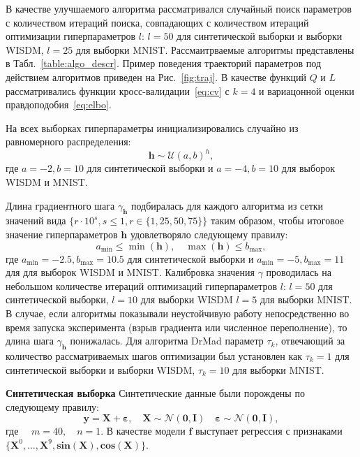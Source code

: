 В качестве улучшаемого алгоритма рассматривался случайный поиск параметров с количеством итераций поиска, совпадающих с количеством итераций оптимизации гиперпараметров $l$: $l=50$ для синтетической выборки и выборки WISDM, $l=25$ для выборки MNIST. Рассмаитрваемые алгоритмы представлены в Табл.~\ref{table:algo_descr}. Пример поведения траекторий параметров под действием алгоритмов приведен на Рис.~\ref{fig:traj}. В качестве функций $Q$ и $L$ рассматривались функции кросс-валидации~\eqref{eq:cv} с $k=4$ и вариацонной оценки правдоподобия~\eqref{eq:elbo}. 




На всех выборках гиперпараметры инициализировались случайно из равномерного распределения:
\[
    \mathbf{h} \sim \mathcal{U}(a,b)^h,
\]
где $a = -2, b = 10$ для синтетической выборки и $a = -4, b = 10$ для выборок WISDM и MNIST.

Длина градиентного шага $\gamma_{\mathbf{h}}$ подбиралась для каждого алгоритма из сетки значений вида $\{r \cdot 10^{s}, s \leq 1, r \in \{1,25,50,75\}\}$  таким образом, чтобы итоговое значение гиперпараметров  $\mathbf{h}$  удовлетворяло следующему правилу:
\[
    a_\text{min} \leq  \min(\mathbf{h}), \quad \max(\mathbf{h}) \leq b_\text{max},
\] 
где  $a_\text{min} = -2.5, b_\text{max}=10.5$ для синтетической выборки и $a_\text{min} = -5, b_\text{max}=11$ для для выборок WISDM и MNIST.
Калибровка значения $\gamma$ проводилась на небольшом количестве итераций оптимизаций гиперпараметров $l$:
$l = 50$ для синтетической выборки,  $l=10$ для выборки WISDM $l=5$ для выборки MNIST. В случае, если алгоритмы показывали неустойчивую работу непосредственно во время запуска эксперимента (взрыв градиента или численное переполнение), то длина шага $\gamma_\mathbf{h}$ понижалась. Для алгоритма DrMad параметр $\tau_k$, отвечающий за количество рассматриваемых шагов оптимизации был установлен как $\tau_k=1$ для синтетической выборки и выборки WISDM, $\tau_k=10$ для выборки MNIST.



\textbf{Синтетическая выборка }
Синтетические данные были порождены по следующему правилу:
\[
	\mathbf{y} = \mathbf{X} + \boldsymbol{\varepsilon},\quad \mathbf{X}  \sim \mathcal{N}(\mathbf{0}, \mathbf{I}) \quad \boldsymbol{\varepsilon} \sim \mathcal{N}(\mathbf{0}, \mathbf{I}),
\]
где $\quad m = 40, \quad n = 1.$
В качестве модели $\mathbf{f}$ выступает регрессия с признаками $\{\mathbf{X}^0, \dots, \mathbf{X}^9, \textbf{sin}(\mathbf{X}), \textbf{cos}(\mathbf{X})\}$.

